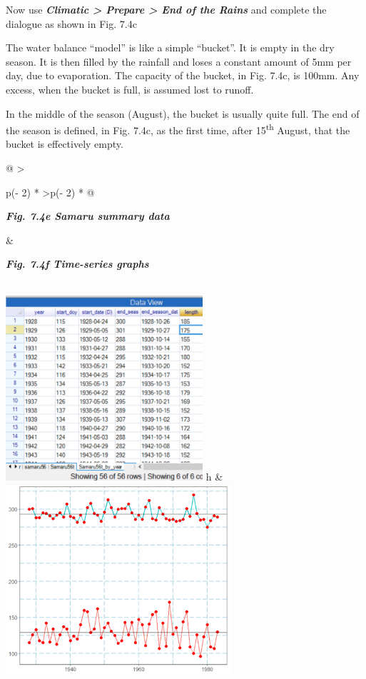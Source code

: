 \documentclass[
  letterpaper,
  DIV=11,
  numbers=noendperiod]{scrreprt}
\begin{document}
Now use \textbf{\emph{Climatic \textgreater{} Prepare \textgreater{} End
of the Rains}} and complete the dialogue as shown in Fig. 7.4c

The water balance ``model'' is like a simple ``bucket''. It is empty in
the dry season. It is then filled by the rainfall and loses a constant
amount of 5mm per day, due to evaporation. The capacity of the bucket,
in Fig. 7.4c, is 100mm. Any excess, when the bucket is full, is assumed
lost to runoff.

In the middle of the season (August), the bucket is usually quite full.
The end of the season is defined, in Fig. 7.4c, as the first time, after
15\textsuperscript{th} August, that the bucket is effectively empty.

\begin{longtable}[]{@{}
  >{\raggedright\arraybackslash}p{(\columnwidth - 2\tabcolsep) * }
  >{\raggedleft\arraybackslash}p{(\columnwidth - 2\tabcolsep) * }@{}}
\toprule\noalign{}
\begin{minipage}[b]{\linewidth}\raggedright
\textbf{\emph{Fig. 7.4e Samaru summary data}}
\end{minipage} & \begin{minipage}[b]{\linewidth}\raggedleft
\textbf{\emph{Fig. 7.4f Time-series graphs}}
\end{minipage} \\
\midrule\noalign{}
\endhead
\bottomrule\noalign{}
\endlastfoot
\includegraphics[width=2.87533in,height=2.70212in]{figures/Fig7.4e.png}
h &
\includegraphics[width=3.27461in,height=\textheight]{figures/Fig7.4f.png} \\
\end{longtable}
\end{document}
